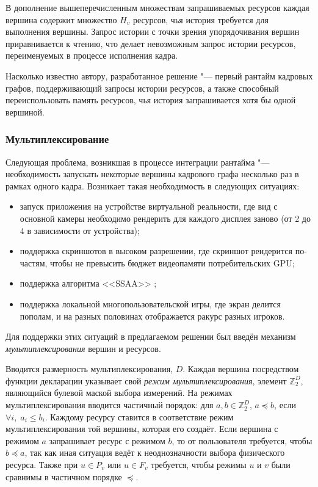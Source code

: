 В дополнение вышеперечисленным множествам запрашиваемых ресурсов каждая вершина содержит множество $H_v$ ресурсов, чья история требуется для выполнения вершины.
Запрос истории с точки зрения упорядочивания вершин приравнивается к чтению, что делает невозможным запрос истории ресурсов, переименуемых в процессе исполнения кадра.

Насколько известно автору, разработанное решение "--- первый рантайм кадровых графов, поддерживающий запросы истории ресурсов, а также способный переиспользовать память ресурсов, чья история запрашивается хотя бы одной вершиной.

\subsubsection{Мультиплексирование}
Следующая проблема, возникшая в процессе интеграции рантайма "--- необходимость запускать некоторые вершины кадрового графа несколько раз в рамках одного кадра.
Возникает такая необходимость в следующих ситуациях:
\begin{itemize}
    \item запуск приложения на устройстве виртуальной реальности, где вид с основной камеры необходимо рендерить для каждого дисплея заново (от 2 до 4 в зависимости от устройства);
    \item поддержка скриншотов в высоком разрешении, где скриншот рендерится по-частям, чтобы не превысить бюджет видеопамяти потребительских GPU;
    \item поддержка алгоритма <<SSAA>> \cite{barronsuper};
    \item поддержка локальной многопользовательской игры, где экран делится пополам, и на разных половинах отображается ракурс разных игроков.
\end{itemize}
Для поддержки этих ситуаций в предлагаемом решении был введён механизм \textit{мультиплексирования} вершин и ресурсов.

Вводится размерность мультиплексирования, $D$.
Каждая вершина посредством функции декларации указывает свой \textit{режим мультиплексирования}, элемент $\mathbb{Z}_2^D$, являющийся булевой маской выбора измерений.
На режимах мультиплексирования вводится частичный порядок: для $a,b\in\mathbb{Z}_2^D$, $a \preceq b$, если $\forall i,\;a_i \leqslant b_i$.
Каждому ресурсу ставится в соответствие режим мультиплексирования той вершины, которая его создаёт.
Если вершина с режимом $a$ запрашивает ресурс с режимом $b$, то от пользователя требуется, чтобы $b \preceq a$, так как иная ситуация ведёт к неоднозначности выбора физического ресурса.
Также при $u \in P_v$ или $u \in F_v$ требуется, чтобы режимы $u$ и $v$ были сравнимы в частичном порядке $\preceq$.

